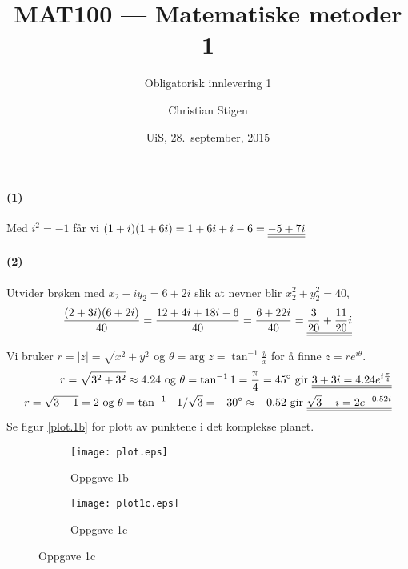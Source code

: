 \documentclass[a4paper,norsk,12pt]{article}
\title{MAT100 --- Matematiske metoder 1}
\subtitle{Obligatorisk innlevering 1}
\author{Christian Stigen}
\date{UiS, 28.~september, 2015}
\begin{document}
\maketitle


\paragraph{(1)}
Med $i^2 = -1$ får vi
\begin{math}
  (1+i)(1+6i) = 1+6i+i-6 = {\underline{\underline{-5+7i}}}
\end{math}

\paragraph{(2)}
Utvider brøken med $x_2 - iy_2 = 6 + 2i$ slik at nevner blir $x_2^2 +
y_2^2 = 40$,
\begin{equation*}
  \frac{(2+3i)(6+2i)}{40} = \frac{12+4i+18i-6}{40}
  = \frac{6+22i}{40} = {\underline{\underline{\frac{3}{20} + \frac{11}{20}i}}}
\end{equation*}


Vi bruker $r = |z| = \sqrt{x^2+y^2}$ og $\theta = \text{arg } z =
\tan^{-1}\frac{y}{x}$ for å finne $z = re^{i\theta}$.
\begin{equation*}
\begin{split}
  r = \sqrt{3^2+3^2} \approx 4.24 \text{ og } \theta = \tan^{-1}{1} =
  \frac{\pi}{4} = 45^\circ \text{ gir } {\underline{\underline{3+3i = 4.24 e^{i\frac{\pi}{4}}}}}
  \\
  r=\sqrt{3+1}=2 \text{ og } \theta = \tan^{-1}{-1/\sqrt{3}} = -30^\circ \approx -0.52
  \text{ gir }
  {\underline{\underline{\sqrt{3}-i = 2e^{-0.52i}}}}
\end{split}
\end{equation*}
%
Se figur \vref{plot.1b} for plott av punktene i det komplekse planet.

\begin{figure}[h]
  \begin{subfigure}[b]{0.5\textwidth}
  \texttt{[image: plot.eps]}
  \caption{Oppgave 1b}
  \label{plot.1b}
  \end{subfigure}
  \begin{subfigure}[b]{0.5\textwidth}
  \texttt{[image: plot1c.eps]}
  \caption{Oppgave 1c}
  \label{plot.1c}
  \end{subfigure}
\end{figure}
\end{document}
